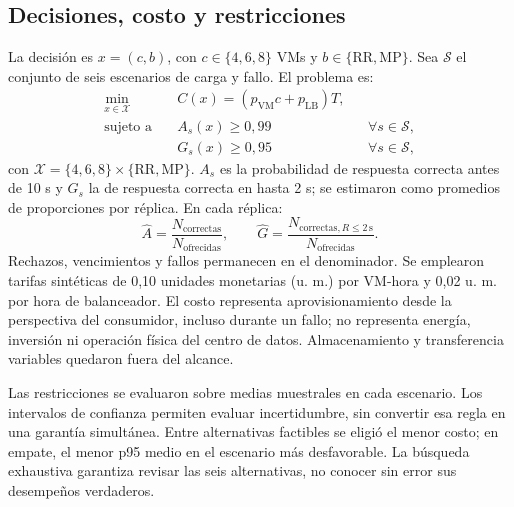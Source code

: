 \subsection{Decisiones, costo y restricciones}
La decisión es $x=(c,b)$, con $c\in\{4,6,8\}$ VMs y $b\in\{\mathrm{RR},\mathrm{MP}\}$. Sea $\mathcal S$ el conjunto de seis escenarios de carga y fallo. El problema es:
\begin{align}
\min_{x\in\mathcal X}\quad&C(x)=(p_{\mathrm{VM}}c+p_{\mathrm{LB}})T,\label{eq:objetivo}\\
\text{sujeto a}\quad&A_s(x)\geq0,99 &&\forall s\in\mathcal S,\label{eq:disp}\\
&G_s(x)\geq0,95 &&\forall s\in\mathcal S,\label{eq:rapidez}
\end{align}
con $\mathcal X=\{4,6,8\}\times\{\mathrm{RR},\mathrm{MP}\}$. $A_s$ es la probabilidad de respuesta correcta antes de 10 s y $G_s$ la de respuesta correcta en hasta 2 s; se estimaron como promedios de proporciones por réplica. En cada réplica:
\begin{equation}
\widehat A=\frac{N_{\mathrm{correctas}}}{N_{\mathrm{ofrecidas}}},\qquad
\widehat G=\frac{N_{\mathrm{correctas},R\leq2\,\mathrm{s}}}{N_{\mathrm{ofrecidas}}}.
\end{equation}
Rechazos, vencimientos y fallos permanecen en el denominador. Se emplearon tarifas sintéticas de 0,10 unidades monetarias (u. m.) por VM-hora y 0,02 u. m. por hora de balanceador. El costo representa aprovisionamiento desde la perspectiva del consumidor, incluso durante un fallo; no representa energía, inversión ni operación física del centro de datos. Almacenamiento y transferencia variables quedaron fuera del alcance.

Las restricciones se evaluaron sobre medias muestrales en cada escenario. Los intervalos de confianza permiten evaluar incertidumbre, sin convertir esa regla en una garantía simultánea. Entre alternativas factibles se eligió el menor costo; en empate, el menor p95 medio en el escenario más desfavorable. La búsqueda exhaustiva garantiza revisar las seis alternativas, no conocer sin error sus desempeños verdaderos.
